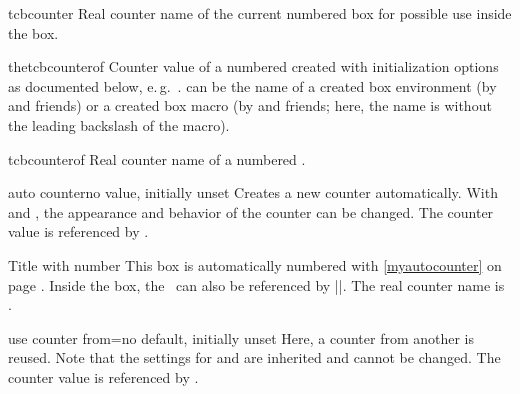 \begin{docCommand}{tcbcounter}{}
Real counter name of the current numbered box for possible use inside the box.
\end{docCommand}

\begin{docCommand}[doc new=2025-07-21]{thetcbcounterof}{}
Counter value of a numbered  created with
initialization options as documented below, e.\,g.\ .
 can be the name of a created box environment (by  and friends)
or a created box macro (by  and friends; here, the name is
without the leading backslash of the macro).
\end{docCommand}

\begin{docCommand}[doc new=2025-07-21]{tcbcounterof}{}
Real counter name of a numbered .
\end{docCommand}


\clearpage
\begin{newTcbKey}{auto counter}{}{no value, initially unset}
Creates a new counter automatically.
With  and
, the appearance and behavior of the counter
can be changed. The counter value is referenced by .


\begin{dispExample}
\begin{pabox}[label={myautocounter}]{Title with number}
This box is automatically numbered with \ref{myautocounter} on page
\pageref{myautocounter}. Inside the box, the \thetcbcounter\ can
also be referenced by |\thetcbcounter|.
The real counter name is \texttt{\tcbcounter}.
\end{pabox}
\end{dispExample}
\end{newTcbKey}


\begin{newTcbKey}{use counter from}{=}{no default, initially unset}
Here, a counter from another  is reused.
Note that the settings for  and
 are inherited and cannot be changed.
The counter value is referenced by .

\end{newTcbKey}


